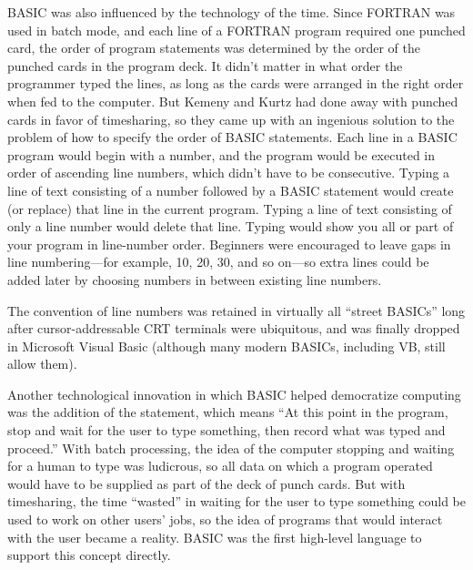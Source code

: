BASIC was also influenced by the technology of the time.  
Since FORTRAN was used in batch mode, and each line of a FORTRAN program
required one punched card, the order of program statements was
determined by the order of the punched cards in the program deck.  It
didn't matter in what order the programmer typed the lines, as long as
the cards were arranged in the right order when fed to the computer.
But 
Kemeny and Kurtz had done away with punched cards in favor of
timesharing, so they
came up with an ingenious solution to the problem of
how to specify the order of BASIC statements.  Each line in a BASIC
program would begin with a number, and the program would be
executed in order of ascending line numbers, which didn't have to be
consecutive.  
Typing a line of text consisting of a number followed by a BASIC statement
would create (or replace) that line in the current program.
Typing a line of text consisting of only a line number would delete that line.
Typing  would show
you all or part of your program in line-number order.
Beginners were encouraged to leave gaps in line
numbering---for example, 10, 20, 30, and so on---so 
extra lines could be added later by choosing numbers in between
existing line numbers.

  \begin{geeknote}
  The convention of line numbers was retained in virtually all ``street
  BASICs'' long after cursor-addressable CRT terminals were ubiquitous,
  and was finally dropped in Microsoft Visual Basic (although many modern
  BASICs, including VB, still allow them).
  \end{geeknote}

Another technological innovation in which BASIC helped democratize
computing was the addition of the 
statement, which means ``At this point in the program, stop and wait for
the user to type something, then record what was typed and proceed.''
With batch processing, the
idea of the computer stopping and waiting for a human to type was
ludicrous, so all data on which a program operated would have to be
supplied as part of the deck of punch cards.
But with timesharing, the time ``wasted'' in waiting for the user to
type something could be used to work on other users' jobs, so
the idea of programs that would interact with the
user became a reality.  BASIC was the first high-level language to
support this concept directly.

